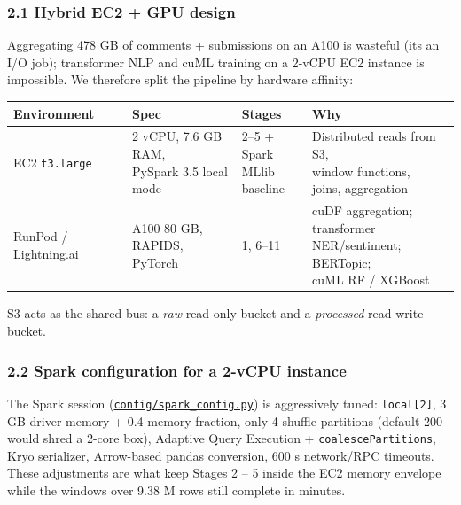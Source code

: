\documentclass[
]{article}
\begin{document}
\subsubsection{2.1 Hybrid EC2 + GPU
design}\label{21-hybrid-ec2--gpu-design}

Aggregating 478 GB of comments + submissions on an A100 is wasteful
(it\textquotesingle s an I/O job); transformer NLP and cuML training on
a 2-vCPU EC2 instance is impossible. We therefore split the pipeline by
hardware affinity:

\begin{table}[H]
\centering
\begin{adjustbox}{max width=\textwidth}
\begin{tabular}{@{}llll@{}}
\toprule
Environment & Spec & Stages & Why \\
\midrule
EC2 \texttt{t3.large}
  & \makecell[l]{2 vCPU, 7.6 GB RAM,\\PySpark 3.5 local mode}
  & \makecell[l]{2--5 +\\Spark MLlib\\baseline}
  & \makecell[l]{Distributed reads from S3,\\window functions,\\joins, aggregation} \\
RunPod / Lightning.ai
  & \makecell[l]{A100 80 GB,\\RAPIDS, PyTorch}
  & 1, 6--11
  & \makecell[l]{cuDF aggregation; transformer\\NER/sentiment; BERTopic;\\cuML RF / XGBoost} \\
\bottomrule
\end{tabular}
\end{adjustbox}
\end{table}

S3 acts as the shared bus: a \emph{raw} read-only bucket and a
\emph{processed} read-write bucket.

\subsubsection{2.2 Spark configuration for a 2-vCPU
instance}\label{22-spark-configuration-for-a-2-vcpu-instance}

The Spark session
(\href{config/spark_config.py}{\texttt{config/spark\_config.py}}) is
aggressively tuned: \texttt{local{[}2{]}}, 3 GB driver memory + 0.4
memory fraction, only 4 shuffle partitions (default 200 would shred a
2-core box), Adaptive Query Execution + \texttt{coalescePartitions},
Kryo serializer, Arrow-based pandas conversion, 600 s network/RPC
timeouts. These adjustments are what keep Stages 2 -- 5 inside the EC2
memory envelope while the windows over 9.38 M rows still complete in
minutes.
\end{document}
